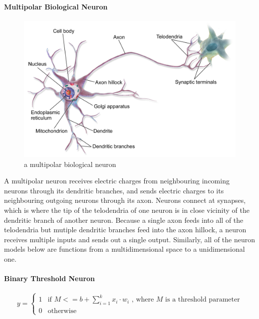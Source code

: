 \documentclass[a4paper,11pt]{article}
\begin{document}
\paragraph{Multipolar Biological Neuron}

\begin{figure}[h!]
	\centering
	\includegraphics[scale=0.3]{images/Biological_Neuron.png}
	\caption{a multipolar biological neuron}
\end{figure}

A multipolar neuron receives electric charges from neighbouring incoming neurons through its dendritic branches, and sends electric charges to its neighbouring outgoing neurons through its axon. Neurons connect at synapses, which is where the tip of the telodendria of one neuron is in close vicinity of the dendritic branch of another neuron. Because a single axon feeds into all of the telodendria but mutiple dendritic branches feed into the axon hillock, a neuron receives multiple inputs and sends out a single output. Similarly, all of the neuron models below are functions from a multidimensional space to a unidimensional one.\\

\paragraph{Binary Threshold Neuron}
\begin{equation}
y = \begin{cases} 1 & \mbox{if } M <= b + \sum\limits_{i=1}^k x_{i}\cdot w_{i}  \text{ , where } M \text{ is a threshold parameter} \\ 
				  0 & \mbox{otherwise} \end{cases}
\end{equation} \\
\end{document}
